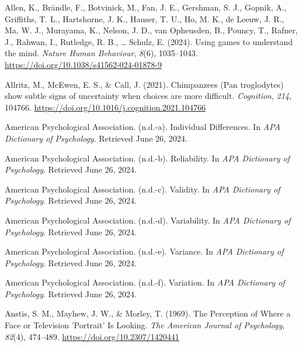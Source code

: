 \documentclass[
]{scrbook}
\newlength{\cslhangindent}
\newenvironment{CSLReferences}[2] %
 {\begin{list}{}{%
  \setlength{\itemindent}{0pt}
  \setlength{\leftmargin}{0pt}
  \setlength{\parsep}{0pt}
  \ifodd #1
   \setlength{\leftmargin}{\cslhangindent}
   \setlength{\itemindent}{-1\cslhangindent}
  \fi
  \setlength{\itemsep}{#2\baselineskip}}}
 {\end{list}}
\begin{document}
\label{refs}
\begin{CSLReferences}{1}{0}
Allen, K., Brändle, F., Botvinick, M., Fan, J. E., Gershman, S. J., Gopnik, A., Griffiths, T. L., Hartshorne, J. K., Hauser, T. U., Ho, M. K., de Leeuw, J. R., Ma, W. J., Murayama, K., Nelson, J. D., van Opheusden, B., Pouncy, T., Rafner, J., Rahwan, I., Rutledge, R. B., \ldots{} Schulz, E. (2024). Using games to understand the mind. \emph{Nature Human Behaviour}, \emph{8}(6), 1035--1043. \url{https://doi.org/10.1038/s41562-024-01878-9}

Allritz, M., McEwen, E. S., \& Call, J. (2021). Chimpanzees ({Pan} troglodytes) show subtle signs of uncertainty when choices are more difficult. \emph{Cognition}, \emph{214}, 104766. \url{https://doi.org/10.1016/j.cognition.2021.104766}

American Psychological Association. (n.d.-a). Individual {Differences}. In \emph{APA Dictionary of Psychology}. Retrieved June 26, 2024.

American Psychological Association. (n.d.-b). Reliability. In \emph{APA Dictionary of Psychology}. Retrieved June 26, 2024.

American Psychological Association. (n.d.-c). Validity. In \emph{APA Dictionary of Psychology}. Retrieved June 26, 2024.

American Psychological Association. (n.d.-d). Variability. In \emph{APA Dictionary of Psychology}. Retrieved June 26, 2024.

American Psychological Association. (n.d.-e). Variance. In \emph{APA Dictionary of Psychology}. Retrieved June 26, 2024.

American Psychological Association. (n.d.-f). Variation. In \emph{APA Dictionary of Psychology}. Retrieved June 26, 2024.

Anstis, S. M., Mayhew, J. W., \& Morley, T. (1969). The {Perception} of {Where} a {Face} or {Television} '{Portrait}' {Is Looking}. \emph{The American Journal of Psychology}, \emph{82}(4), 474--489. \url{https://doi.org/10.2307/1420441}


\end{CSLReferences}
\end{document}
